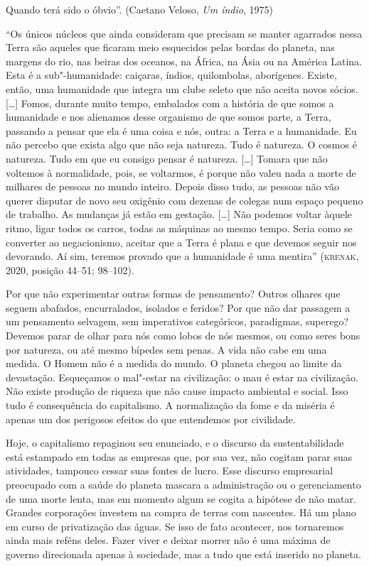 Quando terá sido o óbvio''. (Caetano Veloso, \emph{Um índio}, 1975)

``Os únicos núcleos que ainda consideram que precisam se manter
agarrados nessa Terra são aqueles que ficaram meio esquecidos pelas
bordas do planeta, nas margens do rio, nas beiras dos oceanos, na
África, na Ásia ou na América Latina. Esta é a sub"-humanidade: caiçaras,
índios, quilombolas, aborígenes. Existe, então, uma humanidade que
integra um clube seleto que não aceita novos sócios. {[}\ldots{}{]} Fomos,
durante muito tempo, embalados com a história de que somos a humanidade
e nos alienamos desse organismo de que somos parte, a Terra, passando a
pensar que ela é uma coisa e nós, outra: a Terra e a humanidade. Eu não
percebo que exista algo que não seja natureza. Tudo é natureza. O cosmos
é natureza. Tudo em que eu consigo pensar é natureza. {[}\ldots{}{]} Tomara
que não voltemos à normalidade, pois, se voltarmos, é porque não valeu
nada a morte de milhares de pessoas no mundo inteiro. Depois disso tudo,
as pessoas não vão querer disputar de novo seu oxigênio com dezenas de
colegas num espaço pequeno de trabalho. As mudanças já estão em
gestação. {[}\ldots{}{]} Não podemos voltar àquele ritmo, ligar todos os
carros, todas as máquinas ao mesmo tempo. Seria como se converter ao
negacionismo, aceitar que a Terra é plana e que devemos seguir nos
devorando. Aí sim, teremos provado que a humanidade é uma mentira''
(\textsc{krenak}, 2020, posição 44--51; 98--102).

Por que não experimentar outras formas de pensamento? Outros olhares que
seguem abafados, encurralados, isolados e feridos? Por que não dar
passagem a um pensamento selvagem, sem imperativos categóricos,
paradigmas, superego? Devemos parar de olhar para nós como lobos de nós
mesmos, ou como seres bons por natureza, ou até mesmo bípedes sem penas.
A vida não cabe em uma medida. O Homem não é a medida do mundo. O
planeta chegou ao limite da devastação. Esqueçamos o mal"-estar na
civilização: o mau é estar na civilização. Não existe produção de
riqueza que não cause impacto ambiental e social. Isso tudo é
consequência do capitalismo. A normalização da fome e da miséria é
apenas um dos perigosos efeitos do que entendemos por civilidade.

Hoje, o capitalismo repaginou seu enunciado, e o discurso da
sustentabilidade está estampado em todas as empresas que, por sua vez,
não cogitam parar suas atividades, tampouco cessar suas fontes de lucro.
Esse discurso empresarial preocupado com a saúde do planeta mascara a
administração ou o gerenciamento de uma morte lenta, mas em momento
algum se cogita a hipótese de não matar. Grandes corporações investem na
compra de terras com nascentes. Há um plano em curso de privatização das
águas. Se isso de fato acontecer, nos tornaremos ainda mais reféns
deles. Fazer viver e deixar morrer não é uma máxima de governo
direcionada apenas à sociedade, mas a tudo que está inserido no planeta.

